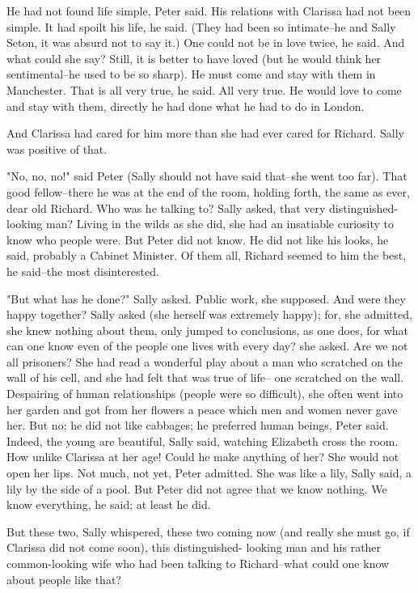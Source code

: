 \documentclass[lang=cn,10pt]{elegantbook}
\begin{document}
He had not found life simple, Peter said.  His relations with
Clarissa had not been simple.  It had spoilt his life, he said.
(They had been so intimate--he and Sally Seton, it was absurd not
to say it.)  One could not be in love twice, he said.  And what
could she say?  Still, it is better to have loved (but he would
think her sentimental--he used to be so sharp).  He must come and
stay with them in Manchester.  That is all very true, he said.  All
very true.  He would love to come and stay with them, directly he
had done what he had to do in London.

And Clarissa had cared for him more than she had ever cared for
Richard.  Sally was positive of that.

"No, no, no!" said Peter (Sally should not have said that--she went
too far).  That good fellow--there he was at the end of the room,
holding forth, the same as ever, dear old Richard.  Who was he
talking to? Sally asked, that very distinguished-looking man?
Living in the wilds as she did, she had an insatiable curiosity to
know who people were.  But Peter did not know.  He did not like his
looks, he said, probably a Cabinet Minister.  Of them all, Richard
seemed to him the best, he said--the most disinterested.

"But what has he done?" Sally asked.  Public work, she supposed.
And were they happy together?  Sally asked (she herself was
extremely happy); for, she admitted, she knew nothing about them,
only jumped to conclusions, as one does, for what can one know even
of the people one lives with every day? she asked.  Are we not all
prisoners?  She had read a wonderful play about a man who scratched
on the wall of his cell, and she had felt that was true of life--
one scratched on the wall.  Despairing of human relationships
(people were so difficult), she often went into her garden and got
from her flowers a peace which men and women never gave her.  But
no; he did not like cabbages; he preferred human beings, Peter
said.  Indeed, the young are beautiful, Sally said, watching
Elizabeth cross the room.  How unlike Clarissa at her age!  Could
he make anything of her?  She would not open her lips.  Not much,
not yet, Peter admitted.  She was like a lily, Sally said, a lily
by the side of a pool.  But Peter did not agree that we know
nothing.  We know everything, he said; at least he did.

But these two, Sally whispered, these two coming now (and really
she must go, if Clarissa did not come soon), this distinguished-
looking man and his rather common-looking wife who had been talking
to Richard--what could one know about people like that?
\end{document}
